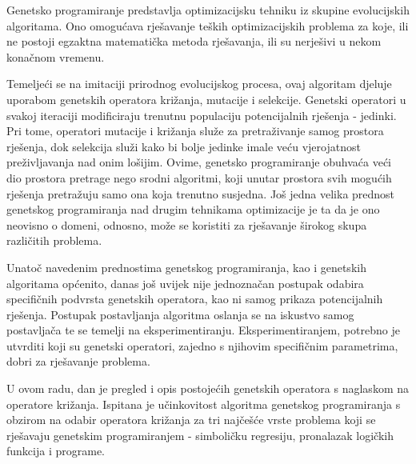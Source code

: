 Genetsko programiranje predstavlja optimizacijsku tehniku iz skupine evolucijskih algoritama. Ono omogućava rješavanje teških optimizacijskih problema za koje, ili ne postoji egzaktna matematička metoda rješavanja, ili su nerješivi u nekom konačnom vremenu. 

Temeljeći se na imitaciji prirodnog evolucijskog procesa, ovaj algoritam djeluje uporabom genetskih operatora križanja, mutacije i selekcije. Genetski operatori u svakoj iteraciji modificiraju trenutnu populaciju potencijalnih rješenja - jedinki. Pri tome, operatori mutacije i križanja služe za pretraživanje samog prostora rješenja, dok selekcija služi kako bi bolje jedinke imale veću vjerojatnost preživljavanja nad onim lošijim. Ovime, genetsko programiranje obuhvaća veći dio prostora pretrage nego srodni algoritmi, koji unutar prostora svih mogućih rješenja pretražuju samo ona koja trenutno susjedna. Još jedna velika prednost genetskog programiranja nad drugim tehnikama optimizacije je ta da je ono neovisno o domeni, odnosno, može se koristiti za rješavanje širokog skupa različitih problema.

Unatoč navedenim prednostima genetskog programiranja, kao i genetskih algoritama općenito, danas još uvijek nije jednoznačan postupak odabira specifičnih podvrsta genetskih operatora, kao ni samog prikaza potencijalnih rješenja. Postupak postavljanja algoritma oslanja se na iskustvo samog postavljača te se temelji na eksperimentiranju. Eksperimentiranjem, potrebno je utvrditi koji su genetski operatori, zajedno s njihovim specifičnim parametrima, dobri za rješavanje problema.

U ovom radu, dan je pregled i opis postojećih genetskih operatora s naglaskom na operatore križanja. Ispitana je učinkovitost algoritma genetskog programiranja s obzirom na odabir operatora križanja za tri najčešće vrste problema koji se rješavaju genetskim programiranjem - simboličku regresiju, pronalazak logičkih funkcija i programe.